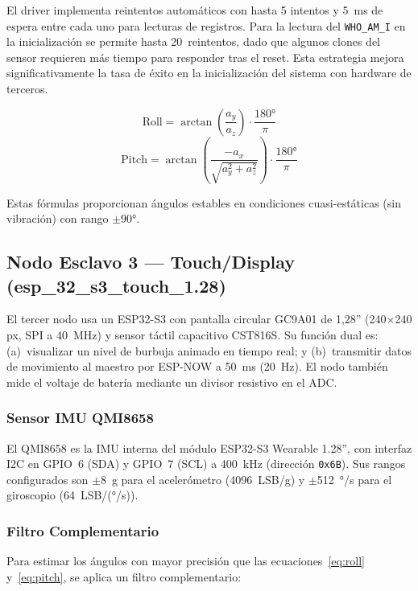 \documentclass[10pt,twocolumn,a4paper]{article}
\begin{document}
El driver implementa reintentos automáticos con hasta 5 intentos y
5~ms de espera entre cada uno para lecturas de registros. Para la
lectura del \texttt{WHO\_AM\_I} en la inicialización se permite hasta
20~reintentos, dado que algunos clones del sensor requieren más tiempo
para responder tras el reset. Esta estrategia mejora significativamente
la tasa de éxito en la inicialización del sistema con hardware de
terceros.

\begin{equation}
  \text{Roll} = \arctan\!\left(\frac{a_y}{a_z}\right)\cdot\frac{180°}{\pi}
  \label{eq:roll}
\end{equation}
\begin{equation}
  \text{Pitch} = \arctan\!\left(\frac{-a_x}{\sqrt{a_y^2+a_z^2}}\right)\cdot\frac{180°}{\pi}
  \label{eq:pitch}
\end{equation}

Estas fórmulas proporcionan ángulos estables en condiciones cuasi-estáticas
(sin vibración) con rango $\pm90°$.

\subsection{Nodo Esclavo 3 — Touch/Display (esp\_32\_s3\_touch\_1.28)}

El tercer nodo usa un ESP32-S3 con pantalla circular GC9A01 de 1,28''
(240$\times$240 px, SPI a 40~MHz) y sensor táctil capacitivo CST816S.
Su función dual es: (a)~visualizar un nivel de burbuja animado en tiempo
real; y (b)~transmitir datos de movimiento al maestro por ESP-NOW a 50~ms
(20~Hz). El nodo también mide el voltaje de batería mediante un divisor
resistivo en el ADC.

\subsubsection{Sensor IMU QMI8658}

El QMI8658 es la IMU interna del módulo ESP32-S3 Wearable 1.28'', con
interfaz I2C en GPIO~6 (SDA) y GPIO~7 (SCL) a 400~kHz (dirección
\texttt{0x6B}). Sus rangos configurados son $\pm$8~g para el
acelerómetro (4096~LSB/g) y $\pm$512~°/s para el giroscopio (64~LSB/(°/s)).

\subsubsection{Filtro Complementario}

Para estimar los ángulos con mayor precisión que las ecuaciones~\ref{eq:roll}
y~\ref{eq:pitch}, se aplica un filtro complementario:
\end{document}
